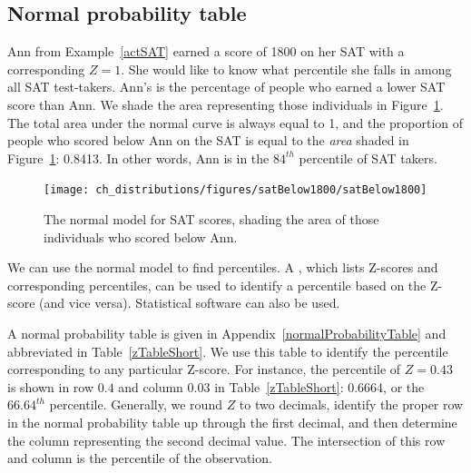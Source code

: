 
\subsection{Normal probability table}

\begin{example}{Ann from Example~\ref{actSAT} earned a score of 1800 on her SAT with a corresponding $Z=1$. She would like to know what percentile she falls in among all SAT test-takers.}
Ann's  is the percentage of people who earned a lower SAT score than Ann. We shade the area representing those individuals in Figure~\ref{satBelow1800}. The total area under the normal curve is always equal to 1, and the proportion of people who scored below Ann on the SAT is equal to the \emph{area} shaded in Figure~\ref{satBelow1800}: 0.8413. In other words, Ann is in the $84^{th}$ percentile of SAT takers.
\end{example}

\begin{figure}[htb]
   \centering
   \texttt{[image: ch\_distributions/figures/satBelow1800/satBelow1800]}
   \caption{The normal model for SAT scores, shading the area of those individuals who scored below Ann.}
   \label{satBelow1800}
\end{figure}

We can use the normal model to find percentiles. A , which lists Z-scores and corresponding percentiles, can be used to identify a percentile based on the Z-score (and vice versa). Statistical software can also be used.

A normal probability table is given in Appendix~\vref{normalProbabilityTable} and abbreviated in Table~\ref{zTableShort}. We use this table to identify the percentile corresponding to any particular Z-score. For instance, the percentile of $Z=0.43$ is shown in row $0.4$ and column $0.03$ in Table~\ref{zTableShort}: 0.6664, or the $66.64^{th}$ percentile. Generally, we round $Z$ to two decimals, identify the proper row in the normal probability table up through the first decimal, and then determine the column representing the second decimal value. The intersection of this row and column is the percentile of the observation.

